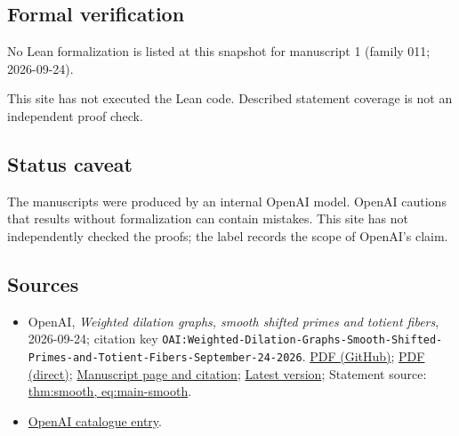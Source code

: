 \documentclass[11pt]{article}
\begin{document}
\subsection{Formal verification}
No Lean formalization is listed at this snapshot for manuscript 1 (family 011; 2026-09-24).

This site has not executed the Lean code. Described statement coverage is not an independent proof check.

\subsection{Status caveat}
The manuscripts were produced by an internal OpenAI model. OpenAI cautions that results without formalization can contain mistakes. This site has not independently checked the proofs; the label records the scope of OpenAI's claim.

\subsection{Sources}
\begin{itemize}
\item OpenAI, \emph{Weighted dilation graphs, smooth shifted primes and totient fibers}, 2026-09-24; citation key \texttt{OAI:Weighted-Dilation-Graphs-Smooth-Shifted-Primes-and-Totient-Fibers-September-24-2026}. \href{https://github.com/openai/math/blob/adc7f1241b42e322a6451854ab7e4b4c146bf78a/preprints/Weighted-Dilation-Graphs-Smooth-Shifted-Primes-and-Totient-Fibers-September-24-2026/paper.pdf}{PDF (GitHub)}; \href{https://github.com/openai/math/raw/adc7f1241b42e322a6451854ab7e4b4c146bf78a/preprints/Weighted-Dilation-Graphs-Smooth-Shifted-Primes-and-Totient-Fibers-September-24-2026/paper.pdf}{PDF (direct)}; \href{https://github.com/openai/math/blob/adc7f1241b42e322a6451854ab7e4b4c146bf78a/preprints/Weighted-Dilation-Graphs-Smooth-Shifted-Primes-and-Totient-Fibers-September-24-2026/README.md}{Manuscript page and citation}; \href{https://github.com/openai/math/blob/main/preprints/Weighted-Dilation-Graphs-Smooth-Shifted-Primes-and-Totient-Fibers-September-24-2026/paper.pdf}{Latest version}; Statement source: \href{https://github.com/openai/math/blob/adc7f1241b42e322a6451854ab7e4b4c146bf78a/preprints/Weighted-Dilation-Graphs-Smooth-Shifted-Primes-and-Totient-Fibers-September-24-2026/build/sections/00-introduction.tex\#L38}{thm:smooth, eq:main-smooth}.
\item \href{https://github.com/openai/math/blob/adc7f1241b42e322a6451854ab7e4b4c146bf78a/CONTENTS.md}{OpenAI catalogue entry}.
\end{itemize}
\end{document}
